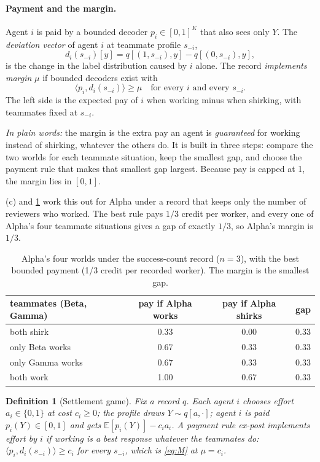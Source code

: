 \documentclass[sigconf,anonymous,acmthm=false]{acmart}
\theoremstyle{acmplain}
\theoremstyle{acmdefinition}
\newtheorem{definition}{Definition}
\newcommand{\plain}[1]{\par\smallskip\noindent\textit{In plain words:} #1\par\smallskip}
\newcommand{\E}{\mathbb{E}}
\newcommand{\cube}{\{0,1\}}
\newcommand{\A}{\textsf{Alpha}}
\newcommand{\B}{\textsf{Beta}}
\newcommand{\G}{\textsf{Gamma}}
\begin{document}
\paragraph{Payment and the margin.} Agent $i$ is paid by a bounded decoder
$p_i\in[0,1]^K$ that also sees only $Y$. The \emph{deviation vector} of agent $i$ at
teammate profile $s_{-i}$,
\[ d_i(s_{-i})[y]=q[(1,s_{-i}),y]-q[(0,s_{-i}),y], \]
is the change in the label distribution caused by $i$ alone. The record \emph{implements
margin} $\mu$ if bounded decoders exist with
\begin{equation}\label{eq:M}\tag{M}
\langle p_i, d_i(s_{-i})\rangle \ge \mu \quad\text{for every } i \text{ and every } s_{-i}.
\end{equation}
The left side is the expected pay of $i$ when working minus when shirking, with
teammates fixed at $s_{-i}$. \plain{the margin is the extra pay an agent is
\emph{guaranteed} for working instead of shirking, whatever the others do. It is built in
three steps: compare the two worlds for each teammate situation, keep the smallest gap,
and choose the payment rule that makes that smallest gap largest. Because pay is capped
at 1, the margin lies in $[0,1]$.}

(c) and \cref{tab:alpha} work this out for \A{} under a record that keeps
only the number of reviewers who worked. The best rule pays $1/3$ credit per worker, and
every one of \A's four teammate situations gives a gap of exactly $1/3$, so \A's margin
is $1/3$.

\begin{table}[t]
\caption{\A's four worlds under the success-count record ($n=3$), with the best bounded
payment (1/3 credit per recorded worker). The margin is the smallest gap.}
\label{tab:alpha}
\footnotesize
\begin{tabular}{@{}lccc@{}}
\toprule
teammates (\B, \G) & pay if \A{} works & pay if \A{} shirks & gap\\
\midrule
both shirk & 0.33 & 0.00 & 0.33\\
only \B{} works & 0.67 & 0.33 & 0.33\\
only \G{} works & 0.67 & 0.33 & 0.33\\
both work & 1.00 & 0.67 & 0.33\\
\bottomrule
\end{tabular}
\end{table}

\begin{definition}[Settlement game]\label{def:game}
Fix a record $q$. Each agent $i$ chooses effort $a_i\in\cube$ at cost $c_i\ge0$; the
profile draws $Y\sim q[a,\cdot]$; agent $i$ is paid $p_i(Y)\in[0,1]$ and gets
$\E[p_i(Y)]-c_ia_i$. A payment rule \emph{ex-post implements} effort by $i$ if working is
a best response whatever the teammates do: $\langle p_i,d_i(s_{-i})\rangle\ge c_i$ for
every $s_{-i}$, which is \eqref{eq:M} at $\mu=c_i$.
\end{definition}
\end{document}
